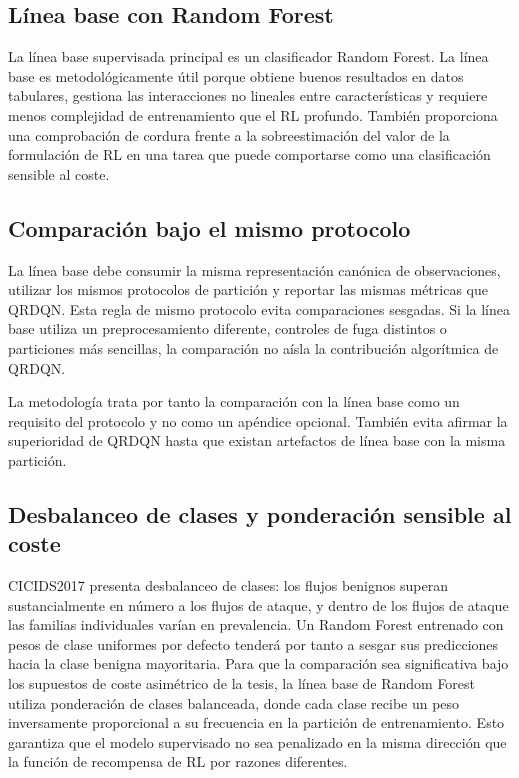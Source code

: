 \subsection{Línea base con Random Forest}
La línea base supervisada principal es un clasificador Random Forest. La línea base es metodológicamente útil porque obtiene buenos resultados en datos tabulares, gestiona las interacciones no lineales entre características y requiere menos complejidad de entrenamiento que el RL profundo. También proporciona una comprobación de cordura frente a la sobreestimación del valor de la formulación de RL en una tarea que puede comportarse como una clasificación sensible al coste.

\subsection{Comparación bajo el mismo protocolo}
La línea base debe consumir la misma representación canónica de observaciones, utilizar los mismos protocolos de partición y reportar las mismas métricas que QRDQN. Esta regla de mismo protocolo evita comparaciones sesgadas. Si la línea base utiliza un preprocesamiento diferente, controles de fuga distintos o particiones más sencillas, la comparación no aísla la contribución algorítmica de QRDQN.

La metodología trata por tanto la comparación con la línea base como un requisito del protocolo y no como un apéndice opcional. También evita afirmar la superioridad de QRDQN hasta que existan artefactos de línea base con la misma partición.

\subsection{Desbalanceo de clases y ponderación sensible al coste}
CICIDS2017 presenta desbalanceo de clases: los flujos benignos superan sustancialmente en número a los flujos de ataque, y dentro de los flujos de ataque las familias individuales varían en prevalencia. Un Random Forest entrenado con pesos de clase uniformes por defecto tenderá por tanto a sesgar sus predicciones hacia la clase benigna mayoritaria. Para que la comparación sea significativa bajo los supuestos de coste asimétrico de la tesis, la línea base de Random Forest utiliza ponderación de clases balanceada, donde cada clase recibe un peso inversamente proporcional a su frecuencia en la partición de entrenamiento. Esto garantiza que el modelo supervisado no sea penalizado en la misma dirección que la función de recompensa de RL por razones diferentes.

